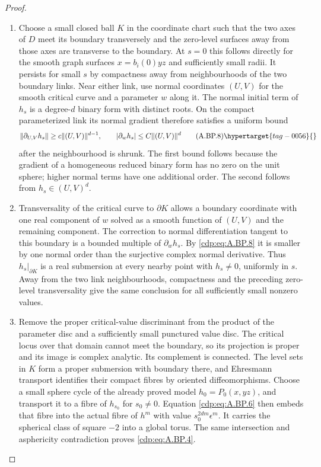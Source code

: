 \begin{proof}
\begin{enumerate}[label={$\langle1\rangle$\arabic*.},leftmargin=*]
\item Choose a small closed ball $K$ in the coordinate
chart such that the two axes of $D$ meet its boundary
transversely and the zero-level surfaces away from
those axes are transverse to the boundary. At
$s=0$ this follows directly for the smooth graph
surfaces $x=b_i(0)yz$ and sufficiently small radii.
It persists for small $s$ by compactness away from
neighbourhoods of the two boundary links.
Near either link, use normal coordinates $(U,V)$
for the smooth critical curve and a parameter $w$
along it. The normal initial term of $h_s$ is a
degree-$d$ binary form with distinct roots.
On the compact parameterized link its normal
gradient therefore satisfies a uniform bound
\[
 \|\partial_{U,V}h_s\|\ge c\|(U,V)\|^{d-1},
 \qquad |\partial_w h_s|\le C\|(U,V)\|^d
                                                        \tag{A.BP.8}\hypertarget{tag-0056}{}\label{cdp:eq:A.BP.8}
\]
after the neighbourhood is shrunk. The first bound
follows because the gradient of a homogeneous
reduced binary form has no zero on the unit sphere;
higher normal terms have one additional order.
The second follows from $h_s\in(U,V)^d$.

\item Transversality of the critical curve to $\partial K$
allows a boundary coordinate with one real component
of $w$ solved as a smooth function of $(U,V)$ and
the remaining component. The correction to normal
differentiation tangent to this boundary is a
bounded multiple of $\partial_w h_s$.
By \eqref{cdp:eq:A.BP.8} it is smaller by one normal order than
the surjective complex normal derivative. Thus
$h_s|_{\partial K}$ is a real submersion at every
nearby point with $h_s\ne0$, uniformly in $s$.
Away from the two link neighbourhoods, compactness
and the preceding zero-level transversality give
the same conclusion for all sufficiently small
nonzero values.

\item Remove the proper critical-value discriminant from
the product of the parameter disc and a sufficiently
small punctured value disc. The critical locus over
that domain cannot meet the boundary, so its
projection is proper and its image is complex
analytic. Its complement is connected. The level
sets in $K$ form a proper submersion with boundary
there, and Ehresmann transport identifies their
compact fibres by oriented diffeomorphisms.
Choose a small sphere cycle of the already proved
model $h_0=P_0(x,yz)$, and transport it to a fibre
of $h_{s_0}$ for $s_0\ne0$. Equation \eqref{cdp:eq:A.BP.6}
then embeds that fibre into the actual fibre
of $h^m$ with value $s_0^{2dm}\epsilon^m$.
It carries the spherical class of square $-2$
into a global torus. The same intersection and
asphericity contradiction proves \eqref{cdp:eq:A.BP.4}.

\end{enumerate}
\end{proof}
